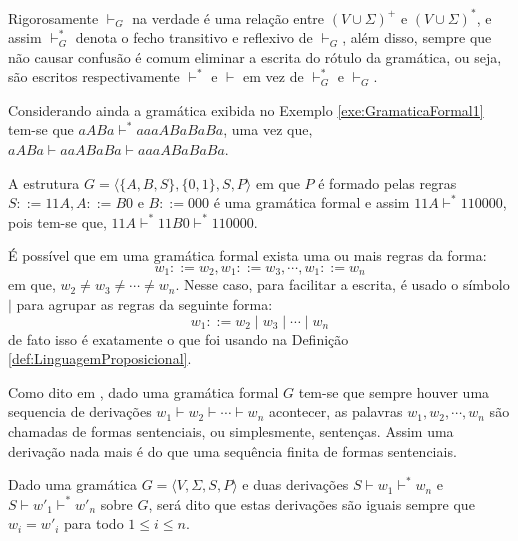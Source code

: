 Rigorosamente $\vdash_G$ na verdade é uma relação entre $(V \cup \Sigma)^+$ e $(V \cup \Sigma)^*$, e assim $\vdash_G^*$ denota o fecho transitivo e reflexivo de  $\vdash_G$, além disso, sempre que não causar confusão é comum eliminar a escrita do rótulo da gramática, ou seja, são escritos respectivamente $\vdash^*$ e $\vdash$ em vez de $\vdash_G^*$ e $\vdash_G$. 

\begin{exemplo}
	Considerando ainda a gramática exibida no Exemplo \ref{exe:GramaticaFormal1} tem-se que $aABa \vdash^* aaaABaBaBa$, uma vez que, $aABa \vdash aaABaBa \vdash aaaABaBaBa$.
\end{exemplo}

\begin{exemplo}\label{exe:GramaticaFormal2}
	A estrutura $G = \langle \{A, B, S\}, \{0,1\}, S, P \rangle$ em que $P$ é formado pelas regras $S ::= 11A, A ::= B0$ e $B ::= 000$ é uma gramática formal e assim $11A \vdash^* 110000$, pois tem-se que, $11A \vdash^* 11B0 \vdash^* 110000$.
\end{exemplo}

\begin{nota}
	É possível que em uma gramática formal exista uma ou mais regras da forma: 
	$$w_1 ::= w_2, w_1 ::= w_3 , \cdots, w_1 ::= w_n$$
	em que, $w_2 \neq w_3 \neq \cdots \neq w_n$. Nesse caso, para facilitar a escrita, é usado o símbolo $\mid$ para agrupar as regras da seguinte forma: 
	$$w_1 ::= w_2 \mid w_3  \mid \cdots \mid  w_n$$
	de fato isso é exatamente o que foi usando na Definição \ref{def:LinguagemProposicional}.
\end{nota}

Como dito em \cite{benjaLivro2010}, dado uma gramática formal $G$ tem-se que sempre houver uma sequencia de derivações $w_1 \vdash w_2 \vdash \cdots \vdash w_n$ acontecer, as palavras $w_1, w_2, \cdots, w_n$ são chamadas de formas sentenciais, ou simplesmente, sentenças. Assim uma derivação nada mais é do que uma sequência finita de formas sentenciais.

\begin{definicao}\label{def:IgualdadeDerivacaoGramatica}
	Dado uma gramática $G = \langle V, \Sigma, S, P \rangle$ e duas derivações $S \vdash w_1 \vdash^* w_n$ e $S \vdash w'_1 \vdash^* w'_n$ sobre $G$, será dito que estas derivações são iguais sempre que $w_i = w'_i$ para todo $1 \leq i \leq n$.
\end{definicao}

